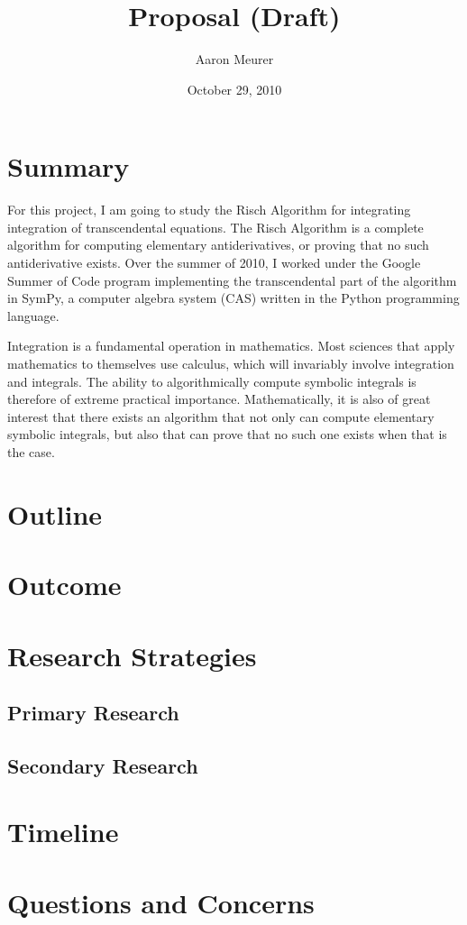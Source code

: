 \documentclass[12pt]{article}
\begin{document}
\title{Proposal (Draft)}
\author{Aaron Meurer}
\date{October 29, 2010}
\maketitle
\section{Summary}
For this project, I am going to study the Risch Algorithm for
integrating integration of transcendental equations.  The Risch
Algorithm is a complete algorithm for computing elementary
antiderivatives, or proving that no such antiderivative exists.  Over
the summer of 2010, I worked under the Google Summer of Code program
implementing the transcendental part of the algorithm in SymPy, a
computer algebra system (CAS) written in the Python programming
language.

Integration is a fundamental operation in mathematics.  Most sciences
that apply mathematics to themselves use calculus, which will invariably
involve integration and integrals.  The ability to algorithmically
compute symbolic integrals is therefore of extreme practical importance.
 Mathematically, it is also of great interest that there exists an
algorithm that not only can compute elementary symbolic integrals, but
also that can prove that no such one exists when that is the case.

\section{Outline}

\section{Outcome}

\section{Research Strategies}
\subsection{Primary Research}

\subsection{Secondary Research}

\section{Timeline}

\section{Questions and Concerns}
\end{document}
